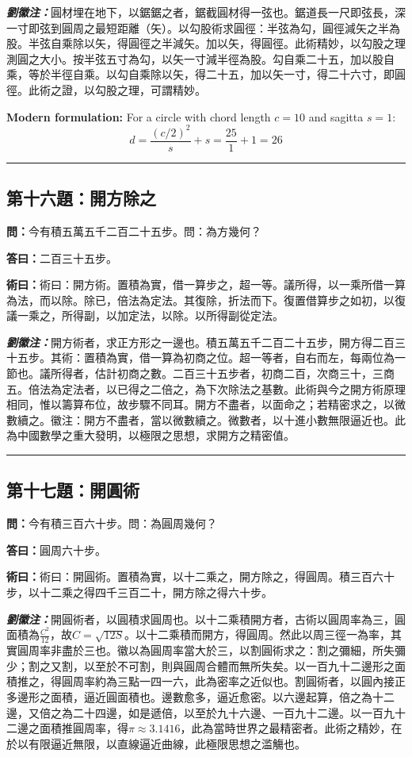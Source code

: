\documentclass[11pt,a4paper]{article}
\newcommand{\wen}[1]{\textbf{\color{problemcolor}問：}#1\par}
\newcommand{\da}[1]{\textbf{答曰：}#1\par}
\newcommand{\shu}[1]{\textbf{術曰：}#1\par}
\newcommand{\liuhui}[1]{{\color{commentarycolor}\textit{\textbf{劉徽注：}}#1\par}}
\begin{document}
\liuhui{圓材埋在地下，以鋸鋸之者，鋸截圓材得一弦也。鋸道長一尺即弦長，深一寸即弦到圓周之最短距離（矢）。以勾股術求圓徑：半弦為勾，圓徑減矢之半為股。半弦自乘除以矢，得圓徑之半減矢。加以矢，得圓徑。此術精妙，以勾股之理測圓之大小。按半弦五寸為勾，以矢一寸減半徑為股。勾自乘二十五，加以股自乘，等於半徑自乘。以勾自乘除以矢，得二十五，加以矢一寸，得二十六寸，即圓徑。此術之證，以勾股之理，可謂精妙。}

\textbf{Modern formulation:} For a circle with chord length $c = 10$ and sagitta $s = 1$:
\[d = \frac{(c/2)^2}{s} + s = \frac{25}{1} + 1 = 26\]

\bigskip
\hrule
\bigskip

\subsection{第十六題：開方除之}

\wen{今有積五萬五千二百二十五步。問：為方幾何？}

\da{二百三十五步。}

\shu{術曰：開方術。置積為實，借一算步之，超一等。議所得，以一乘所借一算為法，而以除。除已，倍法為定法。其復除，折法而下。復置借算步之如初，以復議一乘之，所得副，以加定法，以除。以所得副從定法。}

\liuhui{開方術者，求正方形之一邊也。積五萬五千二百二十五步，開方得二百三十五步。其術：置積為實，借一算為初商之位。超一等者，自右而左，每兩位為一節也。議所得者，估計初商之數。二百三十五步者，初商二百，次商三十，三商五。倍法為定法者，以已得之二倍之，為下次除法之基數。此術與今之開方術原理相同，惟以籌算布位，故步驟不同耳。開方不盡者，以面命之；若精密求之，以微數續之。徽注：開方不盡者，當以微數續之。微數者，以十進小數無限逼近也。此為中國數學之重大發明，以極限之思想，求開方之精密值。}

\bigskip
\hrule
\bigskip

\subsection{第十七題：開圓術}

\wen{今有積三百六十步。問：為圓周幾何？}

\da{圓周六十步。}

\shu{術曰：開圓術。置積為實，以十二乘之，開方除之，得圓周。積三百六十步，以十二乘之得四千三百二十，開方除之得六十步。}

\liuhui{開圓術者，以圓積求圓周也。以十二乘積開方者，古術以圓周率為三，圓面積為$\frac{C^2}{12}$，故$C = \sqrt{12S}$。以十二乘積而開方，得圓周。然此以周三徑一為率，其實圓周率非盡於三也。徽以為圓周率當大於三，以割圓術求之：割之彌細，所失彌少；割之又割，以至於不可割，則與圓周合體而無所失矣。以一百九十二邊形之面積推之，得圓周率約為三點一四一六，此為密率之近似也。割圓術者，以圓內接正多邊形之面積，逼近圓面積也。邊數愈多，逼近愈密。以六邊起算，倍之為十二邊，又倍之為二十四邊，如是遞倍，以至於九十六邊、一百九十二邊。以一百九十二邊之面積推圓周率，得$\pi \approx 3.1416$，此為當時世界之最精密者。此術之精妙，在於以有限逼近無限，以直線逼近曲線，此極限思想之滥觴也。}
\end{document}
